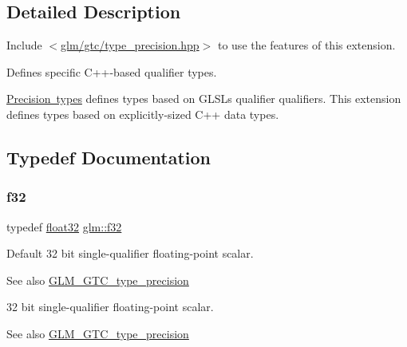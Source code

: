 \subsection{Detailed Description}
Include $<$\mbox{\hyperlink{type__precision_8hpp}{glm/gtc/type\+\_\+precision.\+hpp}}$>$ to use the features of this extension.

Defines specific C++-\/based qualifier types.

\mbox{\hyperlink{group__core__precision}{Precision types}} defines types based on G\+L\+SL\textquotesingle{}s qualifier qualifiers. This extension defines types based on explicitly-\/sized C++ data types. 

\subsection{Typedef Documentation}
\mbox{\label{group__gtc__type__precision_ga0ec999b57f5330d9021256e96038df04}} 
\subsubsection{\texorpdfstring{f32}{f32}}
{\footnotesize\ttfamily typedef \mbox{\hyperlink{group__gtc__type__precision_ga814f2f65354b6588b067cc5c67a6b340}{float32}} \mbox{\hyperlink{group__gtc__type__precision_ga0ec999b57f5330d9021256e96038df04}{glm\+::f32}}}

Default 32 bit single-\/qualifier floating-\/point scalar. \begin{DoxySeeAlso}{See also}
\mbox{\hyperlink{group__gtc__type__precision}{G\+L\+M\+\_\+\+G\+T\+C\+\_\+type\+\_\+precision}}
\end{DoxySeeAlso}
32 bit single-\/qualifier floating-\/point scalar. \begin{DoxySeeAlso}{See also}
\mbox{\hyperlink{group__gtc__type__precision}{G\+L\+M\+\_\+\+G\+T\+C\+\_\+type\+\_\+precision}} 
\end{DoxySeeAlso}
\mbox{\label{group__gtc__type__precision_gace6703eef94c05b9985f85759fb113fa}} 
